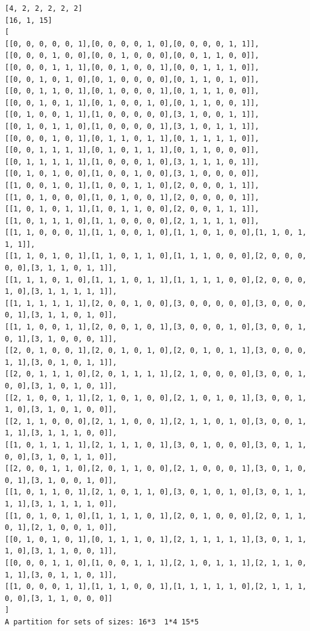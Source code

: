\documentclass[final]{dmtcs-episciences}
\begin{document}
\begin{appendices}
\begin{verbatim} 
[4, 2, 2, 2, 2, 2]
[16, 1, 15]
[
[[0, 0, 0, 0, 0, 1],[0, 0, 0, 0, 1, 0],[0, 0, 0, 0, 1, 1]],
[[0, 0, 0, 1, 0, 0],[0, 0, 1, 0, 0, 0],[0, 0, 1, 1, 0, 0]],
[[0, 0, 0, 1, 1, 1],[0, 0, 1, 0, 0, 1],[0, 0, 1, 1, 1, 0]],
[[0, 0, 1, 0, 1, 0],[0, 1, 0, 0, 0, 0],[0, 1, 1, 0, 1, 0]],
[[0, 0, 1, 1, 0, 1],[0, 1, 0, 0, 0, 1],[0, 1, 1, 1, 0, 0]],
[[0, 0, 1, 0, 1, 1],[0, 1, 0, 0, 1, 0],[0, 1, 1, 0, 0, 1]],
[[0, 1, 0, 0, 1, 1],[1, 0, 0, 0, 0, 0],[3, 1, 0, 0, 1, 1]],
[[0, 1, 0, 1, 1, 0],[1, 0, 0, 0, 0, 1],[3, 1, 0, 1, 1, 1]],
[[0, 0, 0, 1, 0, 1],[0, 1, 1, 0, 1, 1],[0, 1, 1, 1, 1, 0]],
[[0, 0, 1, 1, 1, 1],[0, 1, 0, 1, 1, 1],[0, 1, 1, 0, 0, 0]],
[[0, 1, 1, 1, 1, 1],[1, 0, 0, 0, 1, 0],[3, 1, 1, 1, 0, 1]],
[[0, 1, 0, 1, 0, 0],[1, 0, 0, 1, 0, 0],[3, 1, 0, 0, 0, 0]],
[[1, 0, 0, 1, 0, 1],[1, 0, 0, 1, 1, 0],[2, 0, 0, 0, 1, 1]],
[[1, 0, 1, 0, 0, 0],[1, 0, 1, 0, 0, 1],[2, 0, 0, 0, 0, 1]],
[[1, 0, 1, 0, 1, 1],[1, 0, 1, 1, 0, 0],[2, 0, 0, 1, 1, 1]],
[[1, 0, 1, 1, 1, 0],[1, 1, 0, 0, 0, 0],[2, 1, 1, 1, 1, 0]],
[[1, 1, 0, 0, 0, 1],[1, 1, 0, 0, 1, 0],[1, 1, 0, 1, 0, 0],[1, 1, 0, 1, 1, 1]],
[[1, 1, 0, 1, 0, 1],[1, 1, 0, 1, 1, 0],[1, 1, 1, 0, 0, 0],[2, 0, 0, 0, 0, 0],[3, 1, 1, 0, 1, 1]],
[[1, 1, 1, 0, 1, 0],[1, 1, 1, 0, 1, 1],[1, 1, 1, 1, 0, 0],[2, 0, 0, 0, 1, 0],[3, 1, 1, 1, 1, 1]],
[[1, 1, 1, 1, 1, 1],[2, 0, 0, 1, 0, 0],[3, 0, 0, 0, 0, 0],[3, 0, 0, 0, 0, 1],[3, 1, 1, 0, 1, 0]],
[[1, 1, 0, 0, 1, 1],[2, 0, 0, 1, 0, 1],[3, 0, 0, 0, 1, 0],[3, 0, 0, 1, 0, 1],[3, 1, 0, 0, 0, 1]],
[[2, 0, 1, 0, 0, 1],[2, 0, 1, 0, 1, 0],[2, 0, 1, 0, 1, 1],[3, 0, 0, 0, 1, 1],[3, 0, 1, 0, 1, 1]],
[[2, 0, 1, 1, 1, 0],[2, 0, 1, 1, 1, 1],[2, 1, 0, 0, 0, 0],[3, 0, 0, 1, 0, 0],[3, 1, 0, 1, 0, 1]],
[[2, 1, 0, 0, 1, 1],[2, 1, 0, 1, 0, 0],[2, 1, 0, 1, 0, 1],[3, 0, 0, 1, 1, 0],[3, 1, 0, 1, 0, 0]],
[[2, 1, 1, 0, 0, 0],[2, 1, 1, 0, 0, 1],[2, 1, 1, 0, 1, 0],[3, 0, 0, 1, 1, 1],[3, 1, 1, 1, 0, 0]],
[[1, 0, 1, 1, 1, 1],[2, 1, 1, 1, 0, 1],[3, 0, 1, 0, 0, 0],[3, 0, 1, 1, 0, 0],[3, 1, 0, 1, 1, 0]],
[[2, 0, 0, 1, 1, 0],[2, 0, 1, 1, 0, 0],[2, 1, 0, 0, 0, 1],[3, 0, 1, 0, 0, 1],[3, 1, 0, 0, 1, 0]],
[[1, 0, 1, 1, 0, 1],[2, 1, 0, 1, 1, 0],[3, 0, 1, 0, 1, 0],[3, 0, 1, 1, 1, 1],[3, 1, 1, 1, 1, 0]],
[[1, 0, 1, 0, 1, 0],[1, 1, 1, 1, 0, 1],[2, 0, 1, 0, 0, 0],[2, 0, 1, 1, 0, 1],[2, 1, 0, 0, 1, 0]],
[[0, 1, 0, 1, 0, 1],[0, 1, 1, 1, 0, 1],[2, 1, 1, 1, 1, 1],[3, 0, 1, 1, 1, 0],[3, 1, 1, 0, 0, 1]],
[[0, 0, 0, 1, 1, 0],[1, 0, 0, 1, 1, 1],[2, 1, 0, 1, 1, 1],[2, 1, 1, 0, 1, 1],[3, 0, 1, 1, 0, 1]],
[[1, 0, 0, 0, 1, 1],[1, 1, 1, 0, 0, 1],[1, 1, 1, 1, 1, 0],[2, 1, 1, 1, 0, 0],[3, 1, 1, 0, 0, 0]]
]
A partition for sets of sizes: 16*3  1*4 15*5
\end{verbatim}
\newpage


\end{appendices}
\end{document}
